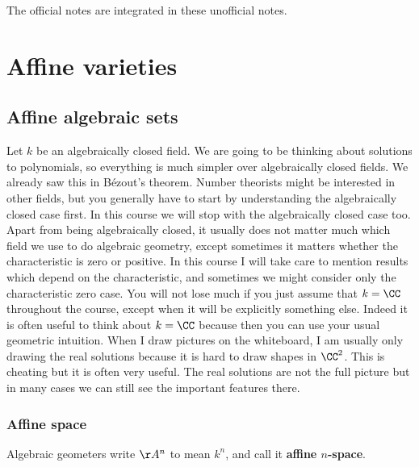 \begin{note*}
The official notes are integrated in these unofficial notes.
\end{note*}

\pagebreak

\section{Affine varieties}

\subsection{Affine algebraic sets}

Let $ k $ be an algebraically closed field. We are going to be thinking about solutions to polynomials, so everything is much simpler over algebraically closed fields. We already saw this in B\'ezout's theorem. Number theorists might be interested in other fields, but you generally have to start by understanding the algebraically closed case first. In this course we will stop with the algebraically closed case too. Apart from being algebraically closed, it usually does not matter much which field we use to do algebraic geometry, except sometimes it matters whether the characteristic is zero or positive. In this course I will take care to mention results which depend on the characteristic, and sometimes we might consider only the characteristic zero case. You will not lose much if you just assume that $ k = \CC $ throughout the course, except when it will be explicitly something else. Indeed it is often useful to think about $ k = \CC $ because then you can use your usual geometric intuition. When I draw pictures on the whiteboard, I am usually only drawing the real solutions because it is hard to draw shapes in $ \CC^2 $. This is cheating but it is often very useful. The real solutions are not the full picture but in many cases we can still see the important features there.

\subsubsection{Affine space}

\begin{definition*}
Algebraic geometers write $ \AA^n $ to mean $ k^n $, and call it \textbf{affine $ n $-space}.
\end{definition*}

